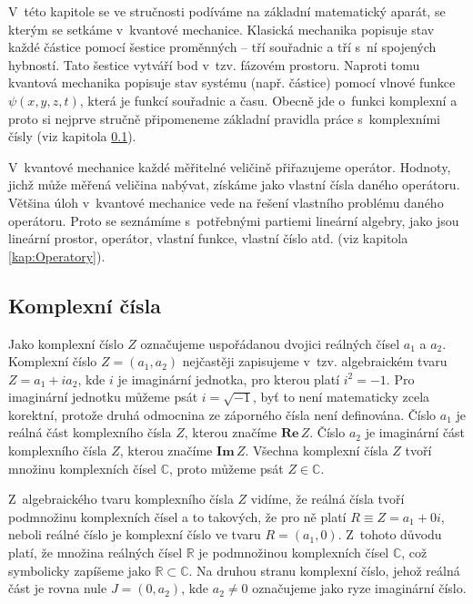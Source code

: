 V~této kapitole se ve stručnosti podíváme na základní matematický aparát, se kterým se setkáme v~kvantové mechanice. Klasická mechanika popisuje stav každé částice pomocí šestice proměnných -- tří souřadnic a tří s~ní spojených hybností. Tato šestice vytváří bod v~tzv. fázovém prostoru. Naproti tomu kvantová mechanika popisuje stav systému (např. částice) pomocí vlnové funkce $\psi(x,y,z,t)$, která je funkcí souřadnic a času. Obecně jde o~funkci komplexní a  proto si nejprve stručně připomeneme základní pravidla práce s~komplexními čísly (viz kapitola \ref{kap:KomplexniCisla}).

V~kvantové mechanice každé měřitelné veličině přiřazujeme operátor. Hodnoty, jichž může měřená veličina nabývat, získáme jako vlastní čísla daného operátoru. Většina úloh v~kvantové mechanice vede na řešení vlastního problému daného operátoru. Proto se seznámíme s~potřebnými partiemi lineární algebry, jako jsou lineární prostor, operátor, vlastní funkce, vlastní číslo atd. (viz kapitola \ref{kap:Operatory}).

\subsection{Komplexní čísla}
\label{kap:KomplexniCisla}

Jako komplexní číslo $Z$ označujeme uspořádanou dvojici reálných čísel $a_1$ a $a_2$. Komplexní číslo $Z = (a_1, a_2)$ nejčastěji zapisujeme v~tzv. algebraickém tvaru $Z = a_1 + i a_2$, kde $i$ je imaginární jednotka, pro kterou platí $i^2 = -1$. Pro imaginární jednotku můžeme psát $i = \sqrt{-1}$, byť to není matematicky zcela korektní, protože druhá odmocnina ze záporného čísla není definována. Číslo $a_1$ je reálná část komplexního čísla $Z$, kterou značíme $\mathbf{Re}\, Z$. Číslo $a_2$ je imaginární část komplexního čísla $Z$, kterou značíme $\mathbf{Im} \, Z$. Všechna komplexní čísla $Z$ tvoří množinu komplexních čísel $\mathbb{C}$, proto můžeme psát $Z \in {\mathbb{C}}$.

Z~algebraického tvaru komplexního čísla $Z$ vidíme, že reálná čísla tvoří podmnožinu komplexních čísel a to takových, že pro ně platí $R \equiv Z = a_1 + 0i$, neboli reálné číslo je komplexní číslo ve tvaru $R = (a_1, 0)$. Z~tohoto důvodu platí, že množina reálných čísel $\mathbb{R}$ je podmnožinou komplexních čísel $\mathbb{C}$, což symbolicky zapíšeme jako $\mathbb{R}\subset \mathbb{C}$. Na druhou stranu komplexní číslo, jehož reálná část je rovna nule $J=(0,a_2)$, kde $a_2 \not = 0$ označujeme jako ryze imaginární číslo.

